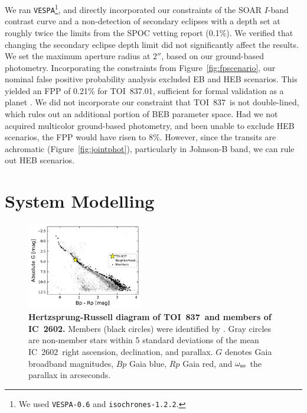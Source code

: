 \documentclass[12pt,twocolumn,tighten]{aastex63}
\newcommand{\tn}{TOI~837} %
\newcommand{\pn}{TOI~837.01} %
\newcommand{\cn}{IC~2602} %
\begin{document}
We ran \texttt{VESPA}\footnote{We used \texttt{VESPA-0.6} and
\texttt{isochrones-1.2.2}.}, and directly incorporated our constraints
of the SOAR $I$-band contrast curve and a non-detection of secondary
eclipses with a depth set at roughly twice the limits from the SPOC
vetting report (0.1\%).  We verified that changing the secondary
eclipse depth limit did not significantly affect the results.  We set
the maximum aperture radius at $2''$, based on our ground-based
photometry.  Incorporating the constraints from
Figure~\ref{fig:fpscenario}, our nominal false positive probability
analysis excluded EB and HEB scenarios.  This yielded an FPP of 0.21\%
for \pn, sufficient for formal validation as a planet
\citep{morton_efficient_2012}.  We did not incorporate our constraint
that \tn\ is not double-lined, which rules out an additional portion
of BEB parameter space.  Had we not acquired multicolor ground-based
photometry, and been unable to exclude HEB scenarios, the FPP would
have risen to 8\%.  However, since the transits are achromatic
(Figure~\ref{fig:jointphot}), particularly in Johnson-B band, we can
rule out HEB scenarios.


\section{System Modelling}
\label{sec:system}

\begin{figure}[!t]
	\begin{center}
		\leavevmode
		\includegraphics[width=0.45\textwidth]{f7.pdf}
	\end{center}
	\vspace{-0.7cm}
	\caption{ 
  {\bf Hertzsprung-Russell diagram of \tn\ and members of \cn.}
  Members (black circles) were identified by
  \citet{cantatgaudin_gaia_2018}.  Gray circles are non-member stars
  within 5 standard deviations of the mean \cn\ right ascension,
  declination, and parallax.  $G$ denotes Gaia broadband magnitudes,
  $Bp$ Gaia blue, $Rp$ Gaia red, and $\omega_{\rm as}$ the parallax in
  arcseconds. 
  \label{fig:hr}
	}
\end{figure}
\end{document}
